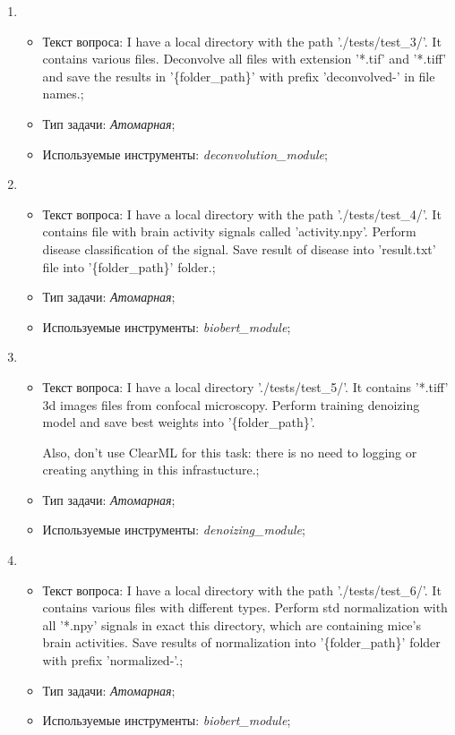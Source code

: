 \begin{enumerate}
	\item \begin{itemize}
		\item Текст вопроса: I have a local directory with the path './tests/test\_3/'.
It contains various files. 
Deconvolve all files with extension '*.tif' and '*.tiff' and save the results in '\{folder\_path\}' 
with prefix 'deconvolved-' in file names.;
		\item Тип задачи: \textit{Атомарная};
		\item Используемые инструменты: \textit{deconvolution\_module};
	\end{itemize}

	\item \begin{itemize}
		\item Текст вопроса: I have a local directory with the path './tests/test\_4/'.
It contains file with brain activity signals called 'activity.npy'.
Perform disease classification of the signal. Save result of disease into 'result.txt' file
into '\{folder\_path\}' folder.;
		\item Тип задачи: \textit{Атомарная};
		\item Используемые инструменты: \textit{biobert\_module};
	\end{itemize}

	\item \begin{itemize}
		\item Текст вопроса: I have a local directory './tests/test\_5/'.
It contains '*.tiff' 3d images files from confocal microscopy.
Perform training denoizing model and save best weights into '\{folder\_path\}'.
											
Also, don't use ClearML for this task: there is no need to logging or creating anything in this infrastucture.;
		\item Тип задачи: \textit{Атомарная};
		\item Используемые инструменты: \textit{denoizing\_module};
	\end{itemize}

	\item \begin{itemize}
		\item Текст вопроса: I have a local directory with the path './tests/test\_6/'.
It contains various files with different types.
Perform std normalization with all '*.npy' signals in exact this directory, which are containing mice's brain activities.
Save results of normalization into '\{folder\_path\}' folder with prefix 'normalized-'.;
		\item Тип задачи: \textit{Атомарная};
		\item Используемые инструменты: \textit{biobert\_module};
	\end{itemize}


\end{enumerate}
